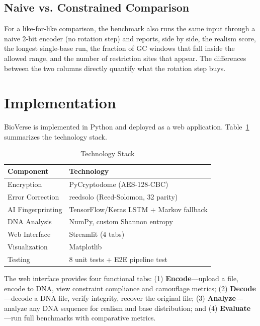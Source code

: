 \documentclass[conference]{IEEEtran}
\begin{document}
\subsection{Naive vs. Constrained Comparison}

For a like-for-like comparison, the benchmark also runs the same input through a naive 2-bit encoder (no rotation step) and reports, side by side, the realism score, the longest single-base run, the fraction of GC windows that fall inside the allowed range, and the number of restriction sites that appear. The differences between the two columns directly quantify what the rotation step buys.

\section{Implementation}

BioVerse is implemented in Python and deployed as a web application. Table~\ref{tab:stack} summarizes the technology stack.

\begin{table}[htbp]
\caption{Technology Stack}
\begin{center}
\begin{tabular}{|l|l|}
\hline
\textbf{Component} & \textbf{Technology} \\
\hline
Encryption & PyCryptodome (AES-128-CBC) \\
\hline
Error Correction & reedsolo (Reed-Solomon, 32 parity) \\
\hline
AI Fingerprinting & TensorFlow/Keras LSTM + Markov fallback \\
\hline
DNA Analysis & NumPy, custom Shannon entropy \\
\hline
Web Interface & Streamlit (4 tabs) \\
\hline
Visualization & Matplotlib \\
\hline
Testing & 8 unit tests + E2E pipeline test \\
\hline
\end{tabular}
\label{tab:stack}
\end{center}
\end{table}

The web interface provides four functional tabs: (1) \textbf{Encode}---upload a file, encode to DNA, view constraint compliance and camouflage metrics; (2) \textbf{Decode}---decode a DNA file, verify integrity, recover the original file; (3) \textbf{Analyze}---analyze any DNA sequence for realism and base distribution; and (4) \textbf{Evaluate}---run full benchmarks with comparative metrics.
\end{document}

